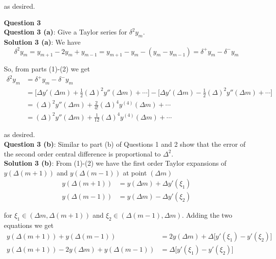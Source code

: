 \documentclass[12pt]{article}
\begin{document}
as desired.



\newpage
{\bf\large Question 3} \\


{\bf Question 3 (a)}: Give a Taylor series for $\delta^2 y_m$. \\

{\bf Solution 3 (a)}: We have
\begin{equation*}
	\delta^2y_m = y_{m + 1} - 2y_m + y_{m - 1} = y_{m + 1} - y_m - (y_m - y_{m - 1}) = \delta^+y_m - \delta^-y_m
\end{equation*}

So, from parts (1)-(2) we get
\begin{align*}
	\delta^2y_m &= \delta^+y_m - \delta^-y_m  \\
	&= \Big[ \Delta y'(\Delta m) + \frac{1}{2}(\Delta)^2y''(\Delta m) + \cdots \Big] - \Big[ \Delta y'(\Delta m) - \frac{1}{2}(\Delta)^2y''(\Delta m) + \cdots \Big] \\
	&= (\Delta)^2y''(\Delta m) + \frac{2}{4!}(\Delta)^4 y^{(4)}(\Delta m) + \cdots \\
	&= (\Delta)^2y''(\Delta m) + \frac{1}{12}(\Delta)^4 y^{(4)}(\Delta m) + \cdots
\end{align*}

as desired. \\


{\bf Question 3 (b)}: Similar to part (b) of Questions 1 and 2 show that the error of the second order central difference is proportional to $\Delta^2$. \\

{\bf Solution 3 (b)}: From (1)-(2) we have the first order Taylor expansions of $y(\Delta(m + 1))$ and $y(\Delta(m - 1))$ at point $(\Delta m)$
\begin{align*}
	y(\Delta(m + 1)) &= y(\Delta m) + \Delta y'(\xi_1) \\
	y(\Delta(m - 1)) &= y(\Delta m) - \Delta y'(\xi_2) 
\end{align*}

for $\xi_1 \in (\Delta m, \Delta(m + 1))$ and $\xi_2 \in (\Delta(m - 1), \Delta m)$. Adding the two equations we get
\begin{align*}
	y(\Delta(m + 1)) + y(\Delta(m - 1)) &= 2y(\Delta m) + \Delta \Big[ y'(\xi_1) - y'(\xi_2) \Big] \\
	y(\Delta(m + 1)) - 2y(\Delta m) + y(\Delta(m - 1)) &=  \Delta \Big[ y'(\xi_1) - y'(\xi_2) \Big]
\end{align*}
\end{document}
